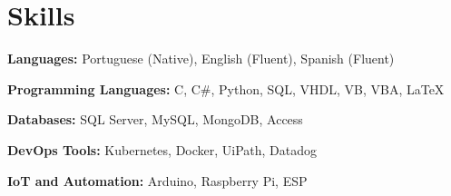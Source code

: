 \section{Skills}
	\textbf{Languages:} Portuguese (Native), English (Fluent), Spanish (Fluent)

	\vspace{0.1 cm}

	\textbf{Programming Languages:} C, C\#, Python, SQL, VHDL, VB, VBA, LaTeX
	
	\vspace{0.1 cm}

	\textbf{Databases:} SQL Server, MySQL, MongoDB, Access

	\vspace{0.1 cm}

	\textbf{DevOps Tools:} Kubernetes, Docker, UiPath, Datadog
	
	\vspace{0.1 cm}

	\textbf{IoT and Automation:} Arduino, Raspberry Pi, ESP